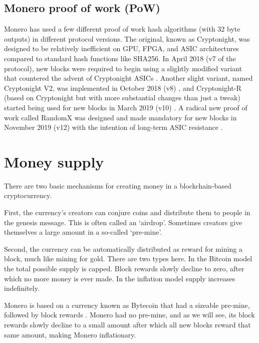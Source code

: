 \subsection*{Monero proof of work (PoW)}

Monero has used a few different proof of work hash algorithms (with 32 byte outputs) in different protocol versions. The original, known as Cryptonight, was designed to be relatively inefficient on GPU, FPGA, and ASIC architectures \cite{CryptoNight} compared to standard hash functions like SHA256. In April 2018 (v7 of the protocol), new blocks were required to begin using a slightly modified variant that countered the advent of Cryptonight ASICs \cite{cryptonight7}. Another slight variant, named Cryptonight V2, was implemented in October 2018 (v8) \cite{berylliumbullet-v8}, and Cryptonight-R (based on Cryptonight but with more substantial changes than just a tweak) started being used for new blocks in March 2019 (v10) \cite{boronbutterfly-v10}. A radical new proof of work called RandomX \cite{randomx-pr-5549} was designed and made mandatory for new blocks in November 2019 (v12) with the intention of long-term ASIC resistance \cite{randomx}.



\section{Money supply}
\label{sec:money-supply}

There are two basic mechanisms for creating money in a blockchain-based cryptocurrency.

First, the currency's creators can conjure coins and distribute them to people in the genesis message. This is often called an `airdrop'. Sometimes creators give themselves a large amount in a so-called `pre-mine'. \cite{premine-description}

Second, the currency can be automatically distributed as reward for mining a block, much like mining for gold. There are two types here. In the Bitcoin model the total possible supply is capped. Block rewards slowly decline to zero, after which no more money is ever made. In the inflation model supply increases indefinitely. 

Monero is based on a currency known as Bytecoin that had a sizeable pre-mine, followed by block rewards \cite{monero-history}. Monero had no pre-mine, and as we will see, its block rewards slowly decline to a small amount after which all new blocks reward that same amount, making Monero inflationary.


